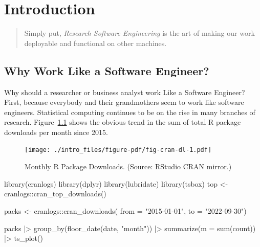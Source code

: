 \documentclass[
  12pt,
  letterpaper,
]{krantz}
\newenvironment{Shaded}{\begin{snugshade}}{\end{snugshade}}
\newcommand{\AttributeTok}[1]{\textcolor[rgb]{0.40,0.45,0.13}{#1}}
\newcommand{\FunctionTok}[1]{\textcolor[rgb]{0.28,0.35,0.67}{#1}}
\newcommand{\NormalTok}[1]{\textcolor[rgb]{0.00,0.23,0.31}{#1}}
\newcommand{\OtherTok}[1]{\textcolor[rgb]{0.00,0.23,0.31}{#1}}
\newcommand{\SpecialCharTok}[1]{\textcolor[rgb]{0.37,0.37,0.37}{#1}}
\newcommand{\StringTok}[1]{\textcolor[rgb]{0.13,0.47,0.30}{#1}}
\begin{document}

\hypertarget{introduction}{%
\chapter{Introduction}\label{introduction}}

\begin{quote}
Simply put, \emph{Research Software Engineering} is the art of making
our work deployable and functional on other machines.
\end{quote}

\hypertarget{why-work-like-a-software-engineer}{%
\section{Why Work Like a Software
Engineer?}\label{why-work-like-a-software-engineer}}

Why should a researcher or business analyst work Like a Software
Engineer? First, because everybody and their grandmothers seem to work
like software engineers. Statistical computing continues to be on the
rise in many branches of research. Figure~\ref{fig-cran-dl} shows the
obvious trend in the sum of total R package downloads per month since
2015.

\begin{figure}

{\centering \texttt{[image: ./intro\_files/figure-pdf/fig-cran-dl-1.pdf]}

}

\caption{\label{fig-cran-dl}Monthly R Package Downloads. (Source:
RStudio CRAN mirror.)}

\end{figure}

\begin{Shaded}
\begin{Highlighting}[]
\FunctionTok{library}\NormalTok{(cranlogs)}
\FunctionTok{library}\NormalTok{(dplyr)}
\FunctionTok{library}\NormalTok{(lubridate)}
\FunctionTok{library}\NormalTok{(tsbox)}
\NormalTok{top }\OtherTok{\textless{}{-}}\NormalTok{ cranlogs}\SpecialCharTok{::}\FunctionTok{cran\_top\_downloads}\NormalTok{()}

\NormalTok{packs }\OtherTok{\textless{}{-}}\NormalTok{ cranlogs}\SpecialCharTok{::}\FunctionTok{cran\_downloads}\NormalTok{(}
                               \AttributeTok{from =} \StringTok{"2015{-}01{-}01"}\NormalTok{,}
                               \AttributeTok{to =} \StringTok{"2022{-}09{-}30"}\NormalTok{)}

\NormalTok{packs }\SpecialCharTok{|\textgreater{}} 
  \FunctionTok{group\_by}\NormalTok{(}\FunctionTok{floor\_date}\NormalTok{(date, }\StringTok{"month"}\NormalTok{)) }\SpecialCharTok{|\textgreater{}} 
  \FunctionTok{summarize}\NormalTok{(}\AttributeTok{m =} \FunctionTok{sum}\NormalTok{(count)) }\SpecialCharTok{|\textgreater{}} 
  \FunctionTok{ts\_plot}\NormalTok{()}
\end{Highlighting}
\end{Shaded}
\end{document}

